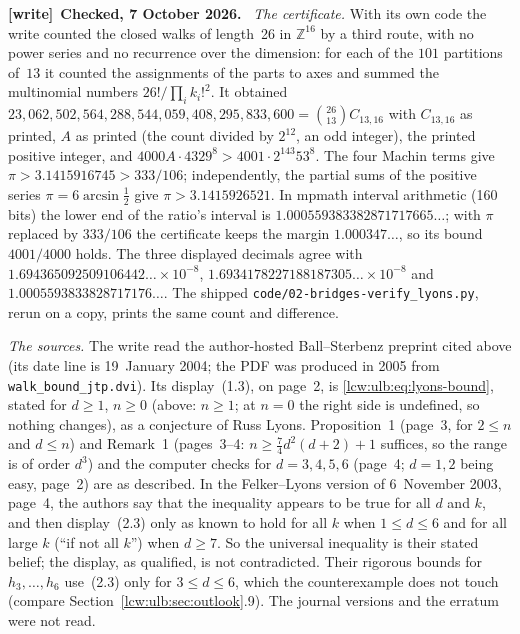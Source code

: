 \documentclass[11pt,letterpaper]{article}
\theoremstyle{remark}\newtheorem{remark}[theorem]{Remark}
\newcommand{\file}[1]{\nolinkurl{#1}}
\newenvironment{writenote}[1][]{\par\smallskip\begingroup\small
 \noindent\textbf{[write]}\if\relax\detokenize{#1}\relax\else~\textbf{#1.}\fi\ }%
 {\par\endgroup\smallskip}
\newcommand{\Z}{\mathbb Z}
\begin{document}
\begin{writenote}[Checked, 7 October 2026]
\emph{The certificate.} With its own code the write counted the closed walks
of length~26 in $\Z^{16}$ by a third route, with no power series and no
recurrence over the dimension: for each of the $101$ partitions of~$13$ it
counted the assignments of the parts to axes and summed the multinomial
numbers $26!/\prod_ik_i!^2$. It obtained
$23{,}062{,}502{,}564{,}288{,}544{,}059{,}408{,}295{,}833{,}600
=\binom{26}{13}C_{13,16}$ with $C_{13,16}$ as printed, $A$ as printed
(the count divided by $2^{12}$, an odd integer), the printed positive
integer, and $4000A\cdot4329^8>4001\cdot2^{143}53^8$. The four Machin terms
give $\pi>3.1415916745>333/106$; independently, the partial sums of the
positive series $\pi=6\arcsin\frac12$ give $\pi>3.1415926521$. In mpmath
interval arithmetic (160 bits) the lower end of the ratio's interval is
$1.000559383382871717665\ldots$; with
$\pi$ replaced by $333/106$ the certificate keeps the margin $1.000347\ldots$,
so its bound $4001/4000$ holds. The three displayed decimals agree with
$1.694365092509106442\ldots\times10^{-8}$,
$1.6934178227188187305\ldots\times10^{-8}$ and
$1.0005593833828717176\ldots$. The shipped
\file{code/02-bridges-verify\_lyons.py}, rerun on a copy, prints the same
count and difference.

\emph{The sources.} The write read the author-hosted Ball--Sterbenz preprint
cited above (its date line is 19~January 2004; the PDF was produced in 2005
from \file{walk\_bound\_jtp.dvi}). Its display~(1.3), on page~2, is
\eqref{lcw:ulb:eq:lyons-bound}, stated for $d\ge1$, $n\ge0$ (above:
$n\ge1$; at $n=0$ the right side is undefined, so nothing changes), as a
conjecture of Russ Lyons. Proposition~1 (page~3, for $2\le n$ and $d\le n$)
and Remark~1 (pages~3--4: $n\ge\frac74d^2(d+2)+1$ suffices, so the range is
of order $d^3$) and the computer checks for $d=3,4,5,6$ (page~4; $d=1,2$
being easy, page~2) are as described. In the Felker--Lyons version of
6~November 2003, page~4, the authors say that the inequality appears to be
true for all $d$ and $k$, and then display~(2.3) only as known to hold for
all $k$ when $1\le d\le6$ and for all large $k$ (``if not all $k$'') when
$d\ge7$. So the
universal inequality is their stated belief; the display, as qualified, is
not contradicted. Their rigorous bounds for $h_3,\dots,h_6$ use~(2.3) only for
$3\le d\le6$, which the counterexample does not touch (compare
Section~\ref{lcw:ulb:sec:outlook}.9). The journal versions and the erratum
were not read.


\end{writenote}
\end{document}
